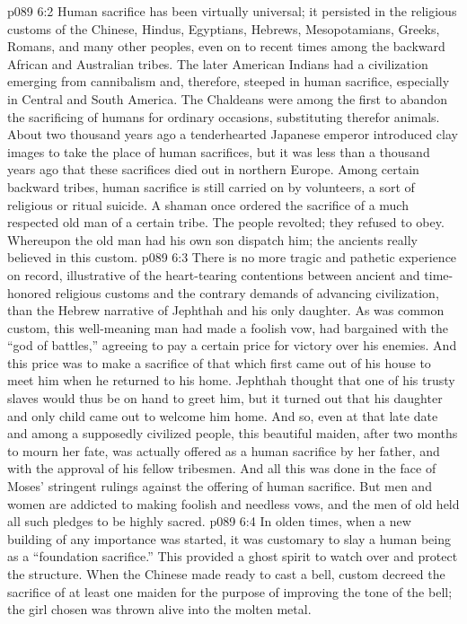 \vs p089 6:2 Human sacrifice has been virtually universal; it persisted in the religious customs of the Chinese, Hindus, Egyptians, Hebrews, Mesopotamians, Greeks, Romans, and many other peoples, even on to recent times among the backward African and Australian tribes. The later American Indians had a civilization emerging from cannibalism and, therefore, steeped in human sacrifice, especially in Central and South America. The Chaldeans were among the first to abandon the sacrificing of humans for ordinary occasions, substituting therefor animals. About two thousand years ago a tenderhearted Japanese emperor introduced clay images to take the place of human sacrifices, but it was less than a thousand years ago that these sacrifices died out in northern Europe. Among certain backward tribes, human sacrifice is still carried on by volunteers, a sort of religious or ritual suicide. A shaman once ordered the sacrifice of a much respected old man of a certain tribe. The people revolted; they refused to obey. Whereupon the old man had his own son dispatch him; the ancients really believed in this custom.\plusone
\pc \vs p089 6:3 There is no more tragic and pathetic experience on record, illustrative of the heart\hyp{}tearing contentions between ancient and time\hyp{}honored religious customs and the contrary demands of advancing civilization, than the Hebrew narrative of Jephthah and his only daughter. As was common custom, this well\hyp{}meaning man had made a foolish vow, had bargained with the “god of battles,” agreeing to pay a certain price for victory over his enemies. And this price was to make a sacrifice of that which first came out of his house to meet him when he returned to his home. Jephthah thought that one of his trusty slaves would thus be on hand to greet him, but it turned out that his daughter and only child came out to welcome him home. And so, even at that late date and among a supposedly civilized people, this beautiful maiden, after two months to mourn her fate, was actually offered as a human sacrifice by her father, and with the approval of his fellow tribesmen. And all this was done in the face of Moses’ stringent rulings against the offering of human sacrifice. But men and women are addicted to making foolish and needless vows, and the men of old held all such pledges to be highly sacred.
\pc \vs p089 6:4 In olden times, when a new building of any importance was started, it was customary to slay a human being as a “foundation sacrifice.” This provided a ghost spirit to watch over and protect the structure. When the Chinese made ready to cast a bell, custom decreed the sacrifice of at least one maiden for the purpose of improving the tone of the bell; the girl chosen was thrown alive into the molten metal.
